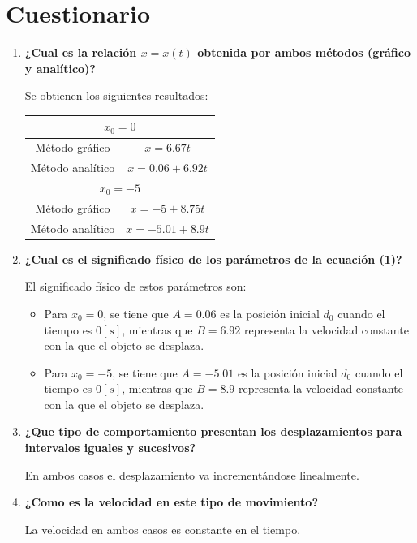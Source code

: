\documentclass[letter,11pt]{article}
\begin{document}
\section{Cuestionario}
\begin{enumerate}
\item \textbf{¿Cual es la relación $x = x(t)$ obtenida por ambos métodos
    (gráfico y analítico)?}

Se obtienen los siguientes resultados:
\begin{center}
\begin{tabular}{|c|c|}
\hline
\multicolumn{2}{|c|}{$x_0 = 0$} \\
\hline
Método gráfico & $x = 6.67 t$ \\
\hline
Método analítico & $x = 0.06 + 6.92 t$ \\
\hline
\hline
\multicolumn{2}{|c|}{$x_0 = -5$} \\
\hline
Método gráfico & $x = -5 + 8.75 t$ \\
\hline
Método analítico & $x = -5.01 + 8.9 t$ \\
\hline
\end{tabular}
\end{center}

\item \textbf{¿Cual es el significado físico de los parámetros de la ecuación (1)?}

El significado físico de estos parámetros son:

\begin{itemize}
\item Para $x_0 = 0$, se tiene que $A = 0.06$ es la posición inicial $d_0$
cuando el tiempo es $0 [s]$, mientras que $B = 6.92$ representa la velocidad
constante con la que el objeto se desplaza.
\item Para $x_0 = -5$, se tiene que $A = -5.01$ es la posición inicial $d_0$
cuando el tiempo es $0 [s]$, mientras que $B = 8.9$ representa la velocidad
constante con la que el objeto se desplaza.
\end{itemize}

\item \textbf{¿Que tipo de comportamiento presentan los desplazamientos para
    intervalos iguales y sucesivos?}

En ambos casos el desplazamiento va incrementándose linealmente.

\item \textbf{¿Como es la velocidad en este tipo de movimiento?}

La velocidad en ambos casos es constante en el tiempo.


\end{enumerate}
\end{document}
